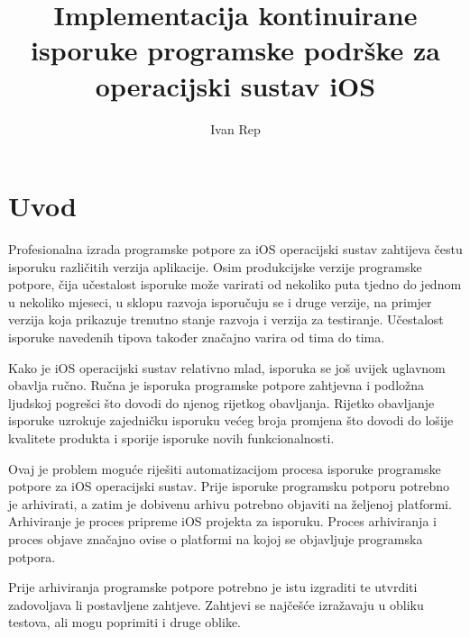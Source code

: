 \documentclass[times, utf8, diplomski, numeric]{fer}
\begin{document}

\title{Implementacija kontinuirane isporuke programske podrške za operacijski sustav iOS}

\author{Ivan Rep}

\maketitle


\tableofcontents

\chapter{Uvod}

Profesionalna izrada programske potpore za iOS operacijski sustav zahtijeva čestu isporuku različitih verzija aplikacije. Osim produkcijske verzije programske potpore, čija učestalost isporuke može varirati od nekoliko puta tjedno do jednom u nekoliko mjeseci, u sklopu razvoja isporučuju se i druge verzije, na primjer verzija koja prikazuje trenutno stanje razvoja i verzija za testiranje. Učestalost isporuke navedenih tipova također značajno varira od tima do tima.

Kako je iOS operacijski sustav relativno mlad, isporuka se još uvijek uglavnom obavlja ručno. Ručna je isporuka programske potpore zahtjevna i podložna ljudskoj pogrešci što dovodi do njenog rijetkog obavljanja. Rijetko obavljanje isporuke uzrokuje zajedničku isporuku većeg broja promjena što dovodi do lošije kvalitete produkta i sporije isporuke novih funkcionalnosti.

Ovaj je problem moguće riješiti automatizacijom procesa isporuke programske potpore za iOS operacijski sustav. Prije isporuke programsku potporu potrebno je arhivirati, a zatim je dobivenu arhivu potrebno objaviti na željenoj platformi. Arhiviranje je proces pripreme iOS projekta za isporuku. Proces arhiviranja i proces objave značajno ovise o platformi na kojoj se objavljuje programska potpora.

Prije arhiviranja programske potpore potrebno je istu izgraditi te utvrditi zadovoljava li postavljene zahtjeve. Zahtjevi se najčešće izražavaju u obliku testova, ali mogu poprimiti i druge oblike.
\end{document}
